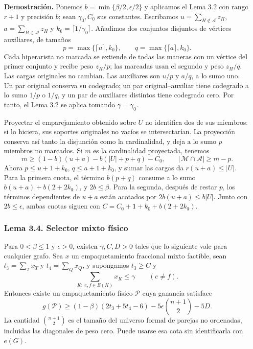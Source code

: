 \documentclass[spanish,11pt,a4paper]{article}
\begin{document}
\textbf{Demostración.} Ponemos \(b=\min\{\beta/2,\epsilon/2\}\) y aplicamos el Lema 3.2 con rango \(r+1\) y precisión \(b\); sean \(\gamma_0,C_0\) sus constantes. Escribamos \(u=\sum_{H\notin\mathcal A}z_H\), \(a=\sum_{H\in\mathcal A}z_H\) y \(k_0=\lceil1/\gamma_0\rceil\). Añadimos dos conjuntos disjuntos de vértices auxiliares, de tamaños \[
p=\max\{\lceil u\rceil,k_0\},\qquad
q=\max\{\lceil a\rceil,k_0\}.
\] Cada hiperarista no marcada se extiende de todas las maneras con un vértice del primer conjunto y recibe peso \(z_H/p\); las marcadas usan el segundo y peso \(z_H/q\). Las cargas originales no cambian. Las auxiliares son \(u/p\) y \(a/q\), a lo sumo uno. Un par original conserva su codegrado; un par original--auxiliar tiene codegrado a lo sumo \(1/p\) o \(1/q\), y un par de auxiliares distintos tiene codegrado cero. Por tanto, el Lema 3.2 se aplica tomando \(\gamma=\gamma_0\).

Proyectar el emparejamiento obtenido sobre \(U\) no identifica dos de sus miembros: si lo hiciera, sus soportes originales no vacíos se intersectarían. La proyección conserva así tanto la disjunción como la cardinalidad, y deja a lo sumo \(p\) miembros no marcados. Si \(m\) es la cardinalidad proyectada, tenemos \[
m\ge(1-b)(u+a)-b(|U|+p+q)-C_0,
\qquad |\mathcal M\cap\mathcal A|\ge m-p.
\] Ahora \(p\le u+1+k_0\), \(q\le a+1+k_0\), y sumar las cargas da \(r(u+a)\le|U|\). Para la primera cuota, el término \(b(p+q)\) consume a lo sumo \(b(u+a)+b(2+2k_0)\), y \(2b\le\beta\). Para la segunda, después de restar \(p\), los términos dependientes de \(u+a\) están acotados por \(2b(u+a)\le b|U|\). Junto con \(2b\le\epsilon\), ambas cuotas siguen con \(C=C_0+1+k_0+b(2+2k_0)\).

\subsubsection{Lema 3.4. Selector mixto físico}\label{lema-3.4.-selector-mixto-fisico}

Para \(0<\beta\le1\) y \(\epsilon>0\), existen \(\gamma,C,D>0\) tales que lo siguiente vale para cualquier grafo. Sea \(x\) un empaquetamiento fraccional mixto factible, sean \(t_3=\sum_Tx_T\) y \(t_4=\sum_Qx_Q\), y supongamos \(t_3\ge C\) y \[
\sum_{K:\ e,f\in E(K)}x_K\le\gamma\qquad(e\ne f).
\tag{3.5}
\] Entonces existe un empaquetamiento físico \(\mathcal P\) cuya ganancia satisface \[
g(\mathcal P)\ge(1-\beta)(2t_3+5t_4-6)
 -5\epsilon\binom{n+1}{2}-5D.
\tag{3.6}
\] La cantidad \(\binom{n+1}{2}\) es el tamaño del universo formal de parejas no ordenadas, incluidas las diagonales de peso cero. Puede usarse esa cota sin identificarla con \(e(G)\).
\end{document}
